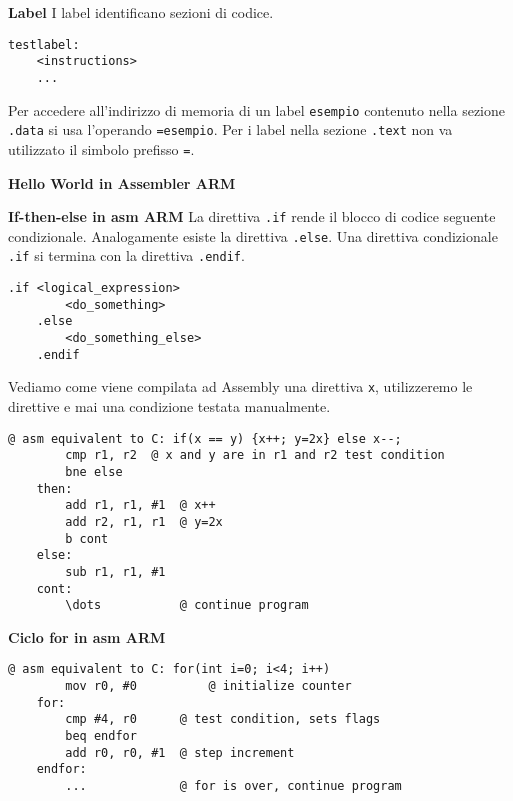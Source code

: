 \begin{defn}
	\textbf{Label}
	I label identificano sezioni di codice.
	
	\begin{lstlisting}[style=arm]
	testlabel:
	<instructions>
	...
	\end{lstlisting}

	Per accedere all'indirizzo di memoria di un label \verb|esempio| contenuto nella sezione \verb|.data| si usa l'operando \verb|=esempio|. Per i label nella sezione \verb|.text| non va utilizzato il simbolo prefisso \verb|=|.
\end{defn}

\begin{exmp}
	\textbf{Hello World in Assembler ARM}
\end{exmp}

\begin{defn}
	\textbf{If-then-else in asm ARM}
	La direttiva \verb|.if| rende il blocco di codice seguente condizionale. Analogamente esiste la direttiva \verb|.else|. Una direttiva condizionale \verb|.if| si termina con la direttiva \verb|.endif|.
	\begin{lstlisting}[style=armn]
	.if <logical_expression>
		<do_something>
	.else
		<do_something_else>
	.endif
	\end{lstlisting}
	
	Vediamo come viene compilata ad Assembly una direttiva \verb|x|, utilizzeremo le direttive e mai una condizione testata manualmente.
	\begin{lstlisting}[style=armn]
	@ asm equivalent to C: if(x == y) {x++; y=2x} else x--;
		cmp r1, r2 	@ x and y are in r1 and r2 test condition
		bne else
	then:
		add r1, r1, #1 	@ x++
		add r2, r1, r1	@ y=2x
		b cont
	else:
		sub r1, r1, #1
	cont:
		\dots			@ continue program
	\end{lstlisting}
\end{defn}

\begin{defn}
	\textbf{Ciclo for in asm ARM}

	\begin{lstlisting}[style=armn]
	@ asm equivalent to C: for(int i=0; i<4; i++)
		mov r0, #0			@ initialize counter
	for:
		cmp #4, r0		@ test condition, sets flags
		beq endfor
		add r0, r0, #1 	@ step increment
	endfor:
		... 			@ for is over, continue program
	\end{lstlisting}
\end{defn}

